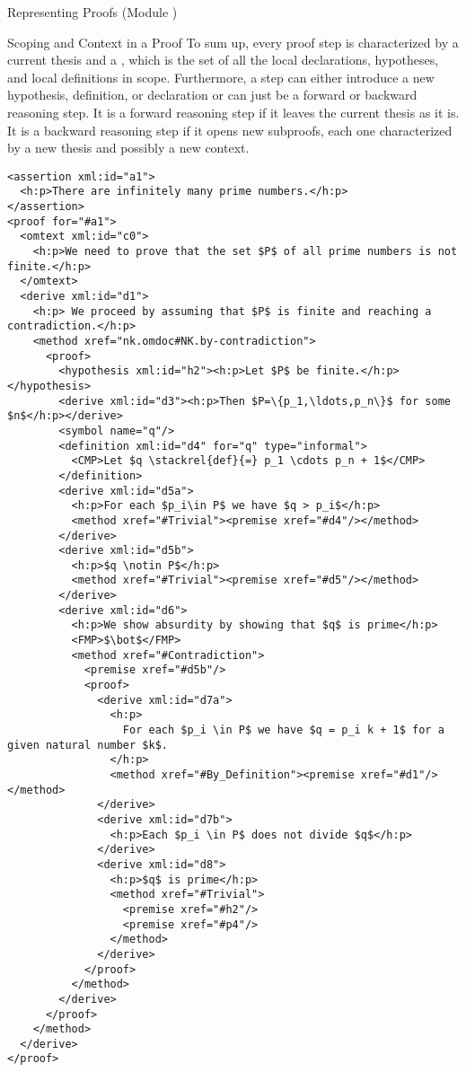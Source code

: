 \begin{omgroup}[id=proofs,short=Representing Proofs]{Representing Proofs (Module {})}
\begin{module}[id=scoping-proofs]
\begin{omgroup}[id=proofs.scoping]{Scoping and Context in a Proof}
To sum up, every proof step is characterized by a current thesis and a {\emph{}},
which is the set of all the local declarations, hypotheses, and local definitions in
scope. Furthermore, a step can either introduce a new hypothesis, definition, or
declaration or can just be a forward or backward reasoning step.  It is a forward
reasoning  step if it leaves the current thesis as it is.  It is a
backward reasoning  step if it opens new subproofs, each one
characterized by a new thesis and possibly a new context.

\begin{lstlisting}[label=lst:primes-omdoc,mathescape,
  caption={A top-down Representation of the Proof in {\myfigref{pf-example1-math}}.},
  index={symbol,definition}]
<assertion xml:id="a1">
  <h:p>There are infinitely many prime numbers.</h:p>
</assertion>
<proof for="#a1">
  <omtext xml:id="c0">
    <h:p>We need to prove that the set $P$ of all prime numbers is not finite.</h:p>
  </omtext>
  <derive xml:id="d1">
    <h:p> We proceed by assuming that $P$ is finite and reaching a contradiction.</h:p>
    <method xref="nk.omdoc#NK.by-contradiction">
      <proof>
        <hypothesis xml:id="h2"><h:p>Let $P$ be finite.</h:p></hypothesis>
        <derive xml:id="d3"><h:p>Then $P=\{p_1,\ldots,p_n\}$ for some $n$</h:p></derive>
        <symbol name="q"/>
        <definition xml:id="d4" for="q" type="informal">
          <CMP>Let $q \stackrel{def}{=} p_1 \cdots p_n + 1$</CMP>
        </definition>
        <derive xml:id="d5a">
          <h:p>For each $p_i\in P$ we have $q > p_i$</h:p>
          <method xref="#Trivial"><premise xref="#d4"/></method>
        </derive>
        <derive xml:id="d5b">
          <h:p>$q \notin P$</h:p>
          <method xref="#Trivial"><premise xref="#d5"/></method>
        </derive>
        <derive xml:id="d6">
          <h:p>We show absurdity by showing that $q$ is prime</h:p>
          <FMP>$\bot$</FMP>
          <method xref="#Contradiction">
            <premise xref="#d5b"/>
            <proof>
              <derive xml:id="d7a">
                <h:p>
                  For each $p_i \in P$ we have $q = p_i k + 1$ for a given natural number $k$.
                </h:p>
                <method xref="#By_Definition"><premise xref="#d1"/></method>
              </derive>
              <derive xml:id="d7b">
                <h:p>Each $p_i \in P$ does not divide $q$</h:p>
              </derive>
              <derive xml:id="d8">
                <h:p>$q$ is prime</h:p>
                <method xref="#Trivial">
                  <premise xref="#h2"/>
                  <premise xref="#p4"/>
                </method>
              </derive>
            </proof>
          </method>
        </derive>
      </proof>
    </method>
  </derive>
</proof>
\end{lstlisting}


\end{omgroup}
\end{module}
\end{omgroup}
